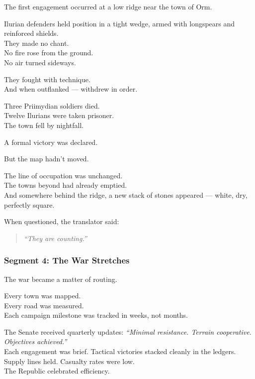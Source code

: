 \documentclass[9pt]{article}
\begin{document}
\vspace{1em}

The first engagement occurred at a low ridge near the town of Orm.

Ilurian defenders held position in a tight wedge, armed with longspears and reinforced shields.\\
They made no chant.\\
No fire rose from the ground.\\
No air turned sideways.

They fought with technique.\\
And when outflanked --- withdrew in order.

Three Priimydian soldiers died.\\
Twelve Ilurians were taken prisoner.\\
The town fell by nightfall.

A formal victory was declared.

\vspace{1em}

But the map hadn’t moved.

The line of occupation was unchanged.\\
The towns beyond had already emptied.\\
And somewhere behind the ridge, a new stack of stones appeared --- white, dry, perfectly square.

When questioned, the translator said:

\begin{quote}
\textit{“They are counting.”}
\end{quote}

\newpage

\subsubsection*{Segment 4: The War Stretches}

The war became a matter of routing.

Every town was mapped.\\
Every road was measured.\\
Each campaign milestone was tracked in weeks, not months.

The Senate received quarterly updates: \textit{“Minimal resistance. Terrain cooperative. Objectives achieved.”}\\
Each engagement was brief. Tactical victories stacked cleanly in the ledgers.\\
Supply lines held. Casualty rates were low.\\
The Republic celebrated efficiency.
\end{document}
